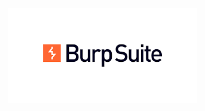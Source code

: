 \documentclass[
	a4paper, %
	12pt, %
]{CSSullivanBusinessReport}
\begin{document}

\thispagestyle{empty} %

\begin{fullwidth} %
	\vspace*{-0.075\textheight} %
	
	\hfill \includegraphics[width=5cm]{Images/burpsuite.png} %

	\vspace{0.15\textheight} %

	\parbox{0.9\fulltextwidth}{\fontsize{50pt}{52pt}\selectfont\raggedright\textbf{\reporttitle}\par} %
	
	\vspace{0.03\textheight} %
	
	{\LARGE\textit{\textbf{\reportsubtitle}}\par} %
	
	\vfill %
	
	{\Large\reportauthors\par} %
	
	\vfill\vfill\vfill %
	
	{\large\reportdate\par} %
\end{fullwidth}

\newpage



\begin{twothirdswidth} %
	\tableofcontents %
\end{twothirdswidth}
\end{document}
